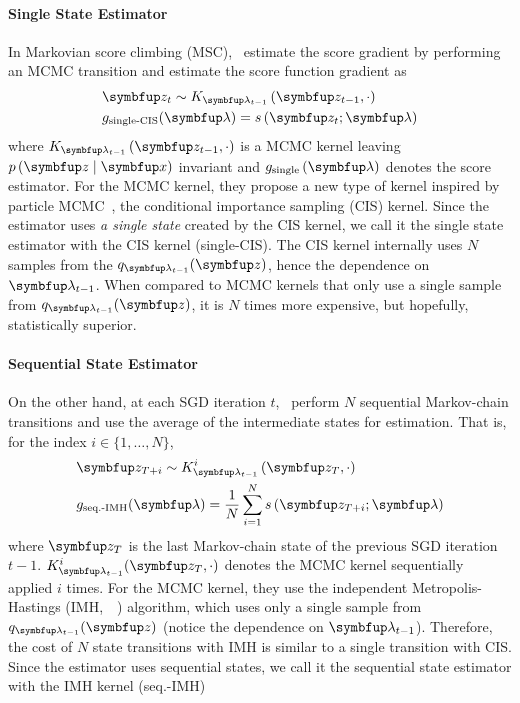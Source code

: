 \vspace{-0.05in}
\paragraph{Single State Estimator}
In Markovian score climbing (MSC),~\citet{NEURIPS2020_b2070693} estimate the score gradient by performing an MCMC transition and estimate the score function gradient as
\vspace{-0.05in}
\begin{align*}
  &\vz_t \sim K_{\vlambda_{t-1}}\left(\vz_{t-1}, \cdot \right) \\
  &g_{\text{single-CIS}}(\vlambda) = s\,(\vz_t; \vlambda)
\end{align*}
where \(K_{\vlambda_{t-1}}\left(\vz_{t-1}, \cdot\right)\) is a MCMC kernel leaving \(p\,(\vz\mid\vx)\) invariant and \(g_{\text{single}}\left(\vlambda\right)\) denotes the score estimator.
For the MCMC kernel, they propose a new type of kernel inspired by particle MCMC~\citep{andrieu_particle_2010, andrieu_uniform_2018}, the conditional importance sampling (CIS) kernel.
Since the estimator uses \textit{a single state} created by the CIS kernel, we call it the single state estimator with the CIS kernel (single-CIS).
The CIS kernel internally uses \(N\) samples from the \(q_{\vlambda_{t-1}}(\vz)\), hence the dependence on \(\vlambda_{t-1}\).
When compared to MCMC kernels that only use a single sample from \(q_{\vlambda_{t-1}}(\vz)\), it is \(N\) times more expensive, but hopefully, statistically superior.

\vspace{-0.08in}
\paragraph{Sequential State Estimator}
On the other hand, at each SGD iteration \(t\),~\citet{pmlr-v124-ou20a} perform \(N\) sequential Markov-chain transitions and use the average of the intermediate states for estimation.
That is, for the index \(i \in \{1, \ldots, N\}\),
\vspace{-0.05in}
\begin{align*}
  &\vz_{T+i} \sim K_{\vlambda_{t-1}}^i\left(\vz_{T}, \cdot \right) \\
  &g_{\text{seq.-IMH}}(\vlambda) = \frac{1}{N} \sum_{i=1}^N s\,(\vz_{T+i}; \vlambda)
\end{align*}
where \(\vz_T\) is the last Markov-chain state of the previous SGD iteration 
\(t-1\).
\(K^{i}_{\vlambda_{t-1}}(\vz_{T}, \cdot)\) denotes the MCMC kernel sequentially applied \(i\) times.
For the MCMC kernel, they use the independent Metropolis-Hastings (IMH,~\citealt[Algorithm 25]{robert_monte_2004}~\citealt{hastings_monte_1970}) algorithm, which uses only a single sample from \(q_{\vlambda_{t-1}}(\vz)\) (notice the dependence on \(\vlambda_{t-1}\)).
Therefore, the cost of \(N\) state transitions with IMH is similar to a single transition with CIS.
Since the estimator uses sequential states, we call it the sequential state estimator with the IMH kernel (seq.-IMH)

